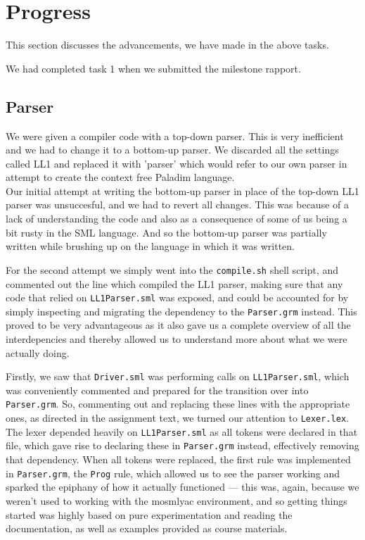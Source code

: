 \documentclass[11pt]{article}
\begin{document}
\section{Progress}
This section discusses the advancements, we have made in the above tasks.

We had completed task 1 when we submitted the milestone rapport.

\subsection{Parser}
We were given a compiler code with a top-down parser. This is very inefficient 
and we had to change it to a bottom-up parser. We discarded all the settings 
called LL1 and replaced it with 'parser' which would refer to our own parser 
in attempt to create the context free Paladim language.
\\
Our initial attempt at writing the bottom-up parser in place of the top-down
LL1 parser was unsuccesful, and we had to revert all changes. This was because
of a lack of understanding the code and also as a consequence of some of us
being a bit rusty in the SML language. And so the bottom-up parser was
partially written while brushing up on the language in which it was written.

For the second attempt we simply went into the {\tt compile.sh} shell script,
and commented out the line which compiled the LL1 parser, making sure that any
code that relied on {\tt LL1Parser.sml} was exposed, and could be accounted
for by simply inspecting and migrating the dependency to the {\tt Parser.grm}
instead. This proved to be very advantageous as it also gave us a complete
overview of all the interdepencies and thereby allowed us to understand more
about what we were actually doing.

Firstly, we saw that {\tt Driver.sml} was performing calls on
{\tt LL1Parser.sml}, which was conveniently commented and prepared for the
transition over into {\tt Parser.grm}. So, commenting out and replacing these
lines with the appropriate ones, as directed in the assignment text, we turned
our attention to {\tt Lexer.lex}. The lexer depended heavily on
{\tt LL1Parser.sml} as all tokens were declared in that file, which gave rise
to declaring these in {\tt Parser.grm} instead, effectively removing that
dependency. When all tokens were replaced, the first rule was implemented in
{\tt Parser.grm}, the {\tt Prog} rule, which allowed us to see the parser
working and sparked the epiphany of how it actually functioned --- this was,
again, because we weren't used to working with the mosmlyac environment, and
so getting things started was highly based on pure experimentation and reading
the documentation, as well as examples provided as course materials.
\end{document}
